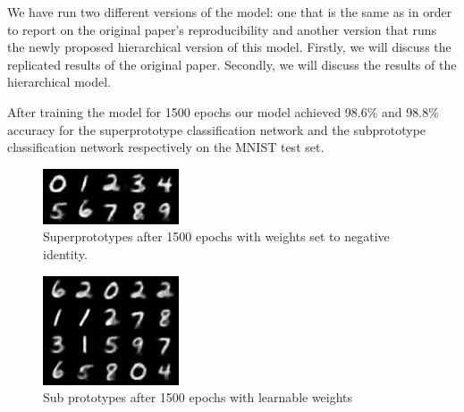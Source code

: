 We have run two different versions of the model: one that is the same as \cite{li2018deep} in order to report on the original paper's reproducibility and another version that runs the newly proposed hierarchical version of this model. Firstly, we will discuss the replicated results of the original paper. Secondly, we will discuss the results of the hierarchical model.



After training the model for 1500 epochs our model achieved 98.6\% and 98.8\% accuracy for the superprototype classification network and the subprototype classification network respectively on the MNIST test set. 

\begin{figure}[ht]
    \centering
    \includegraphics{img/prot1499.png}
    \caption{Superprototypes after 1500 epochs with weights set to negative identity.}
    \label{superprots}
\end{figure}

\begin{figure}[ht]
    \centering
    \includegraphics{img/subprot1499.png}
    \caption{Sub prototypes after 1500 epochs with learnable weights}
    \label{subprots}
\end{figure}


